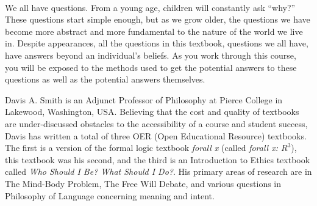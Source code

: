 \clearpage
\thispagestyle{empty}
\pagecolor{black}\afterpage{\nopagecolor}

\vfill
\ 
\parbox{5 in}{\color{white}
We all have questions. From a young age, children will constantly ask ``why?'' These questions start simple enough, but as we grow older, the questions we have become more abstract and more fundamental to the nature of the world we live in. Despite appearances, all the questions in this textbook, questions we all have, have answers beyond an individual's beliefs. As you work through this course, you will be exposed to the methods used to get the potential answers to these questions as well as the potential answers themselves. 
}

\vfill

\parbox{5 in}{\color{white}
Davis A. Smith is an Adjunct Professor of Philosophy at Pierce College in Lakewood, Washington, USA. Believing that the cost and quality of textbooks are under-discussed obstacles to the accessibility of a course and student success, Davis has written a total of three OER (Open Educational Resource) textbooks. The first is a version of the formal logic textbook \emph{forall x} (called \emph{forall x: $R^3$}), this textbook was his second, and the third is an Introduction to Ethics textbook called \emph{Who Should I Be? What Should I Do?}.  His primary areas of research are in The Mind-Body Problem, The Free Will Debate, and various questions in Philosophy of Language concerning meaning and intent. 
}